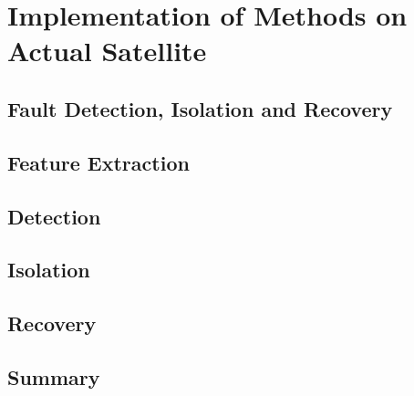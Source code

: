 \chapter{Implementation of Methods on Actual Satellite}
\label{chap:Implementation of Methods on Actual Satellite}

\section{Fault Detection, Isolation and Recovery}

\section{Feature Extraction}

\section{Detection}

\section{Isolation}

\section{Recovery}

\section{Summary}
